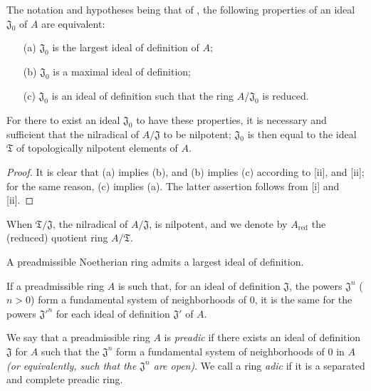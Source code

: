 \begin{corollary}[7.1.6]
\label{0.7.1.6}
The notation and hypotheses being that of , the following
properties of an ideal $\mathfrak{J}_0$ of $A$ are equivalent:
\begin{enumerate}
  \item[{\rm(a)}] $\mathfrak{J}_0$ is the largest ideal of definition of $A$;
  \item[{\rm(b)}] $\mathfrak{J}_0$ is a maximal ideal of definition;
  \item[{\rm(c)}] $\mathfrak{J}_0$ is an ideal of definition such that the ring $A/\mathfrak{J}_0$ is reduced.
\end{enumerate}
For there to exist an ideal $\mathfrak{J}_0$ to have these properties, it is
necessary and sufficient that the nilradical of $A/\mathfrak{J}$ to be
nilpotent; $\mathfrak{J}_0$ is then equal to the ideal $\mathfrak{T}$ of
topologically nilpotent elements of $A$.
\end{corollary}

\begin{proof}
\label{proof-0.7.1.6}
It is clear that (a) implies (b), and (b) implies (c) according to
[ii], and [ii]; for the same
reason, (c) implies (a). The latter assertion follows from [i] and
[ii].
\end{proof}

When $\mathfrak{T}/\mathfrak{J}$, the nilradical of $A/\mathfrak{J}$, is
nilpotent, and we denote by $A_\text{red}$ the (reduced) quotient ring
$A/\mathfrak{T}$.

\begin{corollary}[7.1.7]
\label{0.7.1.7}
A preadmissible Noetherian ring admits a largest ideal of definition.
\end{corollary}

\begin{corollary}[7.1.8]
\label{0.7.1.8}
If a preadmissible ring $A$ is such that, for an ideal of definition
$\mathfrak{J}$, the powers $\mathfrak{J}^n$ ($n>0$) form a fundamental system
of neighborhoods of $0$, it is the same for the powers ${\mathfrak{J}'}^n$ for
each ideal of definition $\mathfrak{J}'$ of $A$.
\end{corollary}

\begin{definition}[7.1.9]
\label{0.7.1.9}
We say that a preadmissible ring $A$ is \emph{preadic} if there exists an
ideal of definition $\mathfrak{J}$ for $A$ such that the $\mathfrak{J}^n$ form
a fundamental system of neighborhoods of $0$ in $A$ \emph{(or equivalently, such
that the $\mathfrak{J}^n$ are \emph{open})}. We call a ring \emph{adic} if it
is a separated and complete preadic ring.
\end{definition}

